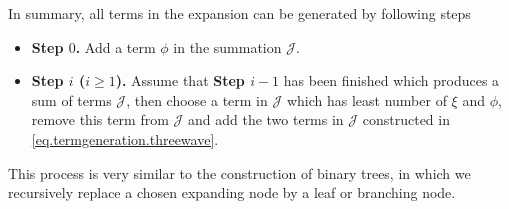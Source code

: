 In summary, all terms in the expansion can be generated by following steps

\begin{itemize}
    \item \textbf{Step $0$.} Add a term $\phi$ in the summation $\mathcal{J}$.
    \item \textbf{Step $i$ ($i\ge 1$).} Assume that \textbf{Step $i-1$} has been finished which produces a sum of terms $\mathcal{J}$, then choose a term in $\mathcal{J}$ which has least number of $\xi$ and $\phi$, remove this term from $\mathcal{J}$ and add the two terms in $\mathcal{J}$ constructed in \eqref{eq.termgeneration.threewave}.
\end{itemize}

This process is very similar to the construction of binary trees, in which we recursively replace a chosen expanding node by a leaf or branching node.

